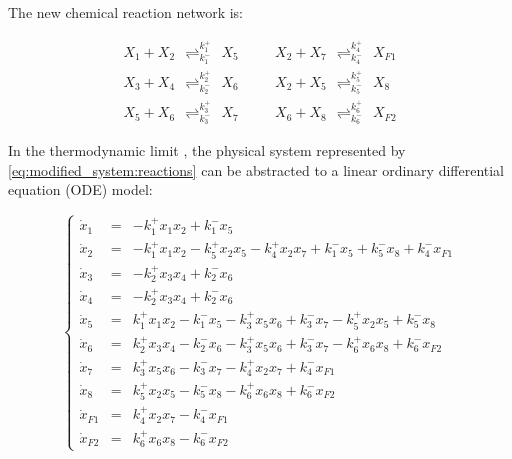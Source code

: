         The new chemical reaction network is:

        \begin{eqnarray}
            X_1 + X_2 ~~{\mathop{\rightleftharpoons}_{k_1^-}^{k_1^+}}~~ X_5 & \quad &  X_2 + X_7 ~~{\mathop{\rightleftharpoons}_{k_4^-}^{k_4^+}}~~ X_{F1} \nonumber \\
            X_3 + X_4 ~~{\mathop{\rightleftharpoons}_{k_2^-}^{k_2^+}}~~ X_6 & & X_2 + X_5 ~~{\mathop{\rightleftharpoons}_{k_5^-}^{k_5^+}}~~ X_8 \nonumber \\
            X_5 + X_6 ~~{\mathop{\rightleftharpoons}_{k_3^-}^{k_3^+}}~~ X_7 & & X_6 + X_8 ~~{\mathop{\rightleftharpoons}_{k_6^-}^{k_6^+}}~~ X_{F2}
            \label{eq:modified_system:reactions}
        \end{eqnarray}


        In the thermodynamic limit \cite{Gillespie:2007p1788}, the physical system represented by \eqref{eq:modified_system:reactions} can be abstracted to a linear ordinary differential equation (ODE) model:

        \begin{equation}\label{eq:ODEequations}
            \left\lbrace\begin{array}{lll}
                \dot{x}_1 &=& - k_1^+ x_1 x_2 + k_1^- x_5  \\
                \dot{x}_2 &=& - k_1^+ x_1 x_2 - k_5^+ x_2 x_5 - k_4^+ x_2 x_7 + k_1^- x_5 + k_{5}^- x_8 + k_4^- x_{F1}  \\
                \dot{x}_3 &=& - k_2^+ x_3 x_4 + k_2^- x_6 \\
                \dot{x}_4 &=& - k_2^+ x_3 x_4 + k_2^- x_6  \\
                \dot{x}_5 &=&   k_1^+ x_1 x_2 - k_1^- x_5 - k_3^+ x_5 x_6 + k_3^- x_7 - k_5^+ x_2 x_5 + k_{5}^- x_8  \\
                \dot{x}_6 &=&   k_2^+ x_3 x_4 - k_2^- x_6 - k_3^+ x_5 x_6 + k_3^- x_7 - k_{6}^+ x_6 x_8 + k_{6}^- x_{F2} \\
                \dot{x}_7 &=&   k_3^+ x_5 x_6 - k_3^- x_7 - k_4^+ x_2 x_7 + k_4^- x_{F1} \\
                \dot{x}_8 &=&   k_5^+ x_2 x_5 - k_{5}^- x_8 - k_{6}^+ x_6 x_8 + k_{6}^- x_{F2} \\
                \dot{x}_{F1} &=& k_4^+ x_2 x_7 - k_4^- x_{F1} \\
                \dot{x}_{F2} &=& k_{6}^+ x_6 x_8 - k_{6}^- x_{F2}
            \end{array}
            \right.
        \end{equation}

